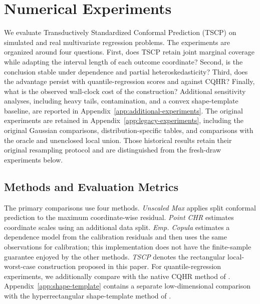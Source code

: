 
\begingroup
\color{blue}
\setlength{\emergencystretch}{2em}

\section{Numerical Experiments}
\label{sec:numerical-experiments}
\label{sec:experiments}

We evaluate Transductively Standardized Conformal Prediction (TSCP) on
simulated and real multivariate regression problems. The experiments are
organized around four questions. First, does TSCP retain joint marginal
coverage while adapting the interval length of each outcome coordinate?
Second, is the conclusion stable under dependence and partial
heteroskedasticity? Third, does the advantage persist with quantile-regression
scores and against CQHR? Finally, what is the observed wall-clock cost of the
construction? Additional sensitivity analyses, including heavy tails,
contamination, and a convex shape-template baseline, are reported in
Appendix~\ref{app:additional-experiments}. The original experiments are
retained in Appendix~\ref{app:legacy-experiments}, including the original
Gaussian comparisons, distribution-specific tables, and comparisons with
the oracle and unenclosed local union. Those historical results retain
their original resampling protocol and are distinguished from the fresh-draw
experiments below.

\subsection{Methods and Evaluation Metrics}
\label{sec:experiment-methods}

The primary comparisons use four methods. \emph{Unscaled Max} applies split
conformal prediction to the maximum coordinate-wise residual. \emph{Point
CHR} estimates coordinate scales using an additional data split. \emph{Emp.
Copula} estimates a dependence model from the calibration residuals and then
uses the same observations for calibration; this implementation does not have
the finite-sample guarantee enjoyed by the other methods. \emph{TSCP} denotes
the rectangular local-worst-case construction proposed in this paper. For
quantile-regression experiments, we additionally compare with the native CQHR
method of \citet{sampson2024conformal}. Appendix~\ref{app:shape-template} contains a
separate low-dimensional comparison with the hyperrectangular shape-template
method of \citet{tumu2024templates}.

